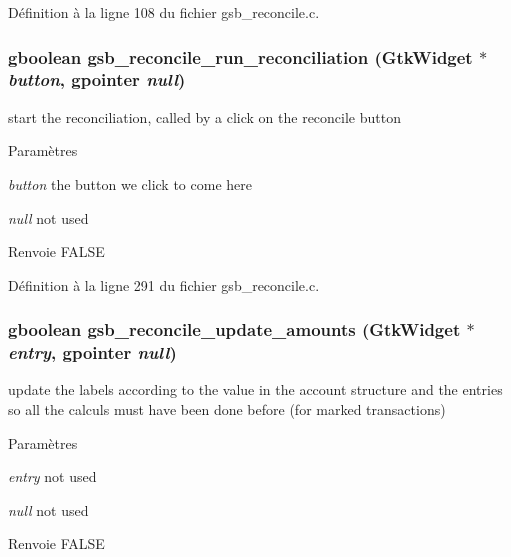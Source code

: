 Définition à la ligne 108 du fichier gsb\_\-reconcile.c.

\subsubsection[{gsb\_\-reconcile\_\-run\_\-reconciliation}]{\setlength{\rightskip}{0pt plus 5cm}gboolean gsb\_\-reconcile\_\-run\_\-reconciliation (GtkWidget $\ast$ {\em button}, \/  gpointer {\em null})}\label{gsb__reconcile_8c_a45c97884b1bd45b63b597a626c38f36d}
start the reconciliation, called by a click on the reconcile button


\begin{DoxyParams}{Paramètres}
\item[{\em button}]the button we click to come here \item[{\em null}]not used\end{DoxyParams}
\begin{DoxyReturn}{Renvoie}
FALSE 
\end{DoxyReturn}


Définition à la ligne 291 du fichier gsb\_\-reconcile.c.

\subsubsection[{gsb\_\-reconcile\_\-update\_\-amounts}]{\setlength{\rightskip}{0pt plus 5cm}gboolean gsb\_\-reconcile\_\-update\_\-amounts (GtkWidget $\ast$ {\em entry}, \/  gpointer {\em null})}\label{gsb__reconcile_8c_ad4e6ccb1415c9f71f856acbb73ce8be3}
update the labels according to the value in the account structure and the entries so all the calculs must have been done before (for marked transactions)


\begin{DoxyParams}{Paramètres}
\item[{\em entry}]not used \item[{\em null}]not used\end{DoxyParams}
\begin{DoxyReturn}{Renvoie}
FALSE 
\end{DoxyReturn}


